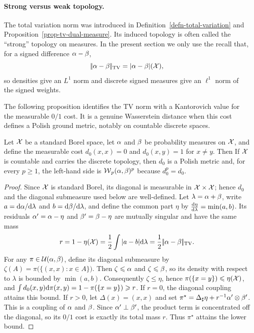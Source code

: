 \paragraph{Strong versus weak topology.}
The total variation norm was introduced in Definition~\ref{defn-total-variation} and Proposition~\ref{prop-tv-dual-measure}. Its induced topology is often called the ``strong'' topology on measures. In the present section we only use the recall that, for a signed difference $\alpha-\beta$,
\[
	|\!| \alpha-\beta |\!|_{\operatorname{TV}}=|\alpha-\beta|(\mathcal{X}),
\]
so densities give an $L^1$ norm and discrete signed measures give an $\ell^1$ norm of the signed weights.

The following proposition identifies the TV norm with a Kantorovich value for the measurable $0/1$ cost. It is a genuine Wasserstein distance when this cost defines a Polish ground metric, notably on countable discrete spaces.

\begin{prop}\label{prop-rel-wass-tv}
		Let $\mathcal{X}$ be a standard Borel space, let $\alpha$ and $\beta$ be probability measures on $\mathcal{X}$, and define the measurable cost $d_0(x,x)=0$ and $d_0(x,y)=1$ for $x\neq y$. Then
		If $\mathcal{X}$ is countable and carries the discrete topology, then $d_0$ is a Polish metric and, for every $p\geq1$, the left-hand side is $\operatorname{\mathcal{W}}_p(\alpha,\beta)^p$ because $d_0^p=d_0$.
\end{prop}
\begin{proof}
		Since $\mathcal{X}$ is standard Borel, its diagonal is measurable in $\mathcal{X}\times\mathcal{X}$; hence $d_0$ and the diagonal submeasure used below are well-defined.
		Let $\lambda=\alpha+\beta$, write $a=\mathrm{d}\alpha/\mathrm{d}\lambda$ and $b=\mathrm{d}\beta/\mathrm{d}\lambda$, and define the common part $\eta$ by
		\(\frac{\mathrm{d}\eta}{\mathrm{d}\lambda}=\min(a,b)\).
		Its residuals $\alpha'=\alpha-\eta$ and $\beta'=\beta-\eta$ are mutually singular and have the same mass
		\[
			r
			=
			1-\eta(\mathcal{X})
			=
			\frac12\int|a-b|\mathrm{d}\lambda
			=
			\frac12|\!| \alpha-\beta |\!|_{\operatorname{TV}}.
		\]
		For any $\pi\in\mathcal{U}(\alpha,\beta)$, define its diagonal submeasure by
		\(\zeta(A)=\pi\bigl(\{(x,x):x\in A\}\bigr)\).
		Then $\zeta\leqslant\alpha$ and $\zeta\leqslant\beta$, so its density with respect to $\lambda$ is bounded by $\min(a,b)$. Consequently $\zeta\leq\eta$, hence $\pi(\{x=y\})\leqslant\eta(\mathcal{X})$, and
		$\int d_0(x,y)\mathrm{d}\pi(x,y)=1-\pi(\{x=y\})\geqslant r$.
		If $r=0$, the diagonal coupling attains this bound. If $r>0$, let $\Delta(x)=(x,x)$ and set
		$\pi^\star=\Delta_\sharp\eta+r^{-1}\alpha^{\prime}\otimes\beta^{\prime}$.
		This is a coupling of $\alpha$ and $\beta$. Since $\alpha'\perp\beta'$, the product term is concentrated off the diagonal, so its $0/1$ cost is exactly its total mass $r$. Thus $\pi^\star$ attains the lower bound.
\end{proof}


